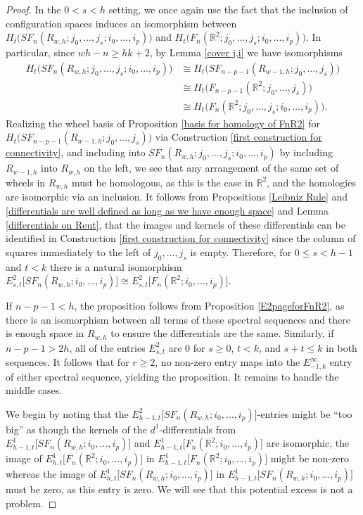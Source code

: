 \documentclass[pagebackref,colorlinks,citecolor=blue,linkcolor=blue,urlcolor=blue,filecolor=blue]{article}
\theoremstyle{definition}\newtheorem{definition}[thm]{Definition}
\theoremstyle{definition}
\newcommand{\R}{\ensuremath{\mathbb{R}}}
\begin{document}
\begin{proof}
In the $0<s<h$ setting, we once again use the fact that the inclusion of 
configuration spaces induces an isomorphism between $H_{t}\big(SF_{n}(R_{w,h}; j_{0}, \dots, j_{s}; i_{0}, \dots, i_{p})\big)$ and $H_{t}\big(F_{n}(\R^{2}; j_{0}, \dots, j_{s}; i_{0}, \dots, i_{p})\big)$.
In particular, since $wh-n\ge hk+2$, by Lemma \ref{cover j,i} we have isomorphisms
\begin{align*}
H_{t}\big(SF_{n}(R_{w,h}; j_{0}, \dots, j_{s}; i_{0}, \dots, i_{p})\big)&\cong H_{t}\big(SF_{n-p-1}(R_{w-1,h}; j_{0}, \dots, j_{s})\big)\\
&\cong H_{t}\big(F_{n-p-1}(\R^{2}; j_{0}, \dots, j_{s})\big)\\
&\cong H_{t}\big(F_{n}(\R^{2}; j_{0}, \dots, j_{s}; i_{0}, \dots, i_{p})\big).
\end{align*}
Realizing the wheel basis of Proposition \ref{basis for homology of FnR2} for $H_{t}\big(SF_{n-p-1}(R_{w-1,h}; j_{0}, \dots, j_{s})\big)$ via Construction \ref{first construction for connectivity}, and including into $SF_{n}(R_{w,h}; j_{0}, \dots, j_{s}; i_{0}, \dots, i_{p})$ by including $R_{w-1,h}$ into $R_{w,h}$ on the left, we see that any arrangement of the same set of wheels in $R_{w,h}$ must be homologous, as this is the case in $\R^{2}$, and the homologies are isomorphic via an inclusion.
It follows from Propositions \ref{Leibniz Rule} and \ref{differentials are well defined as long as we have enough space} and Lemma \ref{differentials on Reut}, that the images and kernels of these differentials can be identified in Construction \ref{first construction for connectivity} since the column of squares immediately to the left of $j_{0},\dots, j_{s}$ is empty.
Therefore, for $0\le s<h-1$ and $t<k$ there is a natural isomorphism
$E^{2}_{s,t}\big[SF_{n}(R_{w,h};i_{0}, \dots, i_{p})\big]\cong E^{2}_{s,t}\big[F_{n}(\R^{2};i_{0}, \dots, i_{p})\big]$.

If $n-p-1<h$, the proposition follows from Proposition \ref{E2pageforFnR2}, as there is an isomorphism between all terms of these spectral sequences and there is enough space in $R_{w,h}$ to ensure the differentials are the same.
Similarly, if $n-p-1>2h$, all of the entries $E^{2}_{s,t}$ are $0$ for $s\ge 0$, $t<k$, and $s+t\le k$ in both sequences.
It follows that for $r\ge 2$, no non-zero entry maps into the $E^{\infty}_{-1,k}$ entry of either spectral sequence, yielding the proposition.
It remains to handle the middle cases.

We begin by noting that the $E^{2}_{h-1, t}\big[SF_{n}(R_{w,h}; i_{0}, \dots, i_{p})\big]$-entries might be ``too big'' as though the kernels of the $d^{1}$-differentials from $E^{1}_{h-1, t}\big[SF_{n}(R_{w,h}; i_{0}, \dots, i_{p})\big]$ and $E^{1}_{h-1, t}\big[F_{n}(\R^{2}; i_{0}, \dots, i_{p})\big]$ are isomorphic, the image of $E^{1}_{h, t}\big[F_{n}(\R^{2}; i_{0}, \dots, i_{p})\big]$ in  $E^{1}_{h-1, t}\big[F_{n}(\R^{2}; i_{0}, \dots, i_{p})\big]$ might be non-zero whereas the image of $E^{1}_{h, t}\big[SF_{n}(R_{w,h}; i_{0}, \dots, i_{p})\big]$ in $E^{1}_{h-1, t}\big[SF_{n}(R_{w,h}; i_{0}, \dots, i_{p})\big]$must be zero, as this entry is zero.
We will see that this potential excess is not a problem. 


\end{proof}
\end{document}
